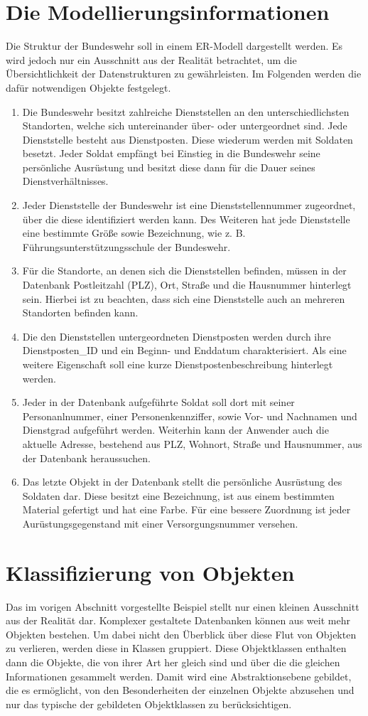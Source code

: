 \section{Die Modellierungsinformationen}
Die Struktur der Bundeswehr soll in einem ER-Modell dargestellt werden.
Es wird jedoch nur ein Ausschnitt aus der Realität betrachtet, um die
Übersichtlichkeit der Datenstrukturen zu gewährleisten. Im Folgenden
werden die dafür notwendigen Objekte festgelegt.
\clearpage
\begin{enumerate}
    \item Die Bundeswehr besitzt zahlreiche Dienststellen an den unterschiedlichsten Standorten, welche sich untereinander über- oder untergeordnet sind. Jede Dienststelle besteht aus Dienstposten. Diese wiederum werden mit Soldaten besetzt. Jeder Soldat empfängt bei Einstieg in die Bundeswehr seine persönliche Ausrüstung und besitzt diese dann für die Dauer seines Dienstverhältnisses.
    \item Jeder Dienststelle der Bundeswehr ist eine Dienststellennummer zugeordnet, über die diese identifiziert werden kann. Des Weiteren hat jede Dienststelle eine bestimmte Größe sowie Bezeichnung, wie z. B. Führungsunterstützungsschule der Bundeswehr.
    \item Für die Standorte, an denen sich die Dienststellen befinden, müssen in der Datenbank Postleitzahl (PLZ), Ort, Straße und die Hausnummer hinterlegt sein. Hierbei ist zu beachten, dass sich eine Dienststelle auch an mehreren Standorten befinden kann.
    \item Die den Dienststellen untergeordneten Dienstposten werden durch ihre Dienstposten\_ID und ein Beginn- und Enddatum charakterisiert. Als eine weitere Eigenschaft soll eine kurze Dienstpostenbeschreibung hinterlegt werden.
    \item Jeder in der Datenbank aufgeführte Soldat soll dort mit seiner Personanlnummer, einer Personenkennziffer, sowie Vor- und Nachnamen und Dienstgrad aufgeführt werden. Weiterhin kann der Anwender auch die aktuelle Adresse, bestehend aus PLZ, Wohnort, Straße und Hausnummer, aus der Datenbank heraussuchen.
    \item Das letzte Objekt in der Datenbank stellt die persönliche Ausrüstung des Soldaten dar. Diese besitzt eine Bezeichnung, ist aus einem bestimmten Material gefertigt und hat eine Farbe. Für eine bessere Zuordnung ist jeder Aurüstungsgegenstand mit einer Versorgungsnummer versehen.
\end{enumerate}
\section{Klassifizierung von Objekten}
Das im vorigen Abschnitt vorgestellte Beispiel stellt nur einen kleinen Ausschnitt aus der Realität dar. Komplexer gestaltete Datenbanken können aus weit mehr Objekten bestehen.
Um dabei nicht den Überblick über diese Flut von Objekten zu verlieren, werden diese in Klassen gruppiert. Diese Objektklassen enthalten dann die Objekte, die von ihrer Art her gleich sind und über die die gleichen Informationen gesammelt werden. Damit wird eine Abstraktionsebene gebildet, die es ermöglicht, von den Besonderheiten der einzelnen Objekte abzusehen und nur das typische der gebildeten Objektklassen zu berücksichtigen.
